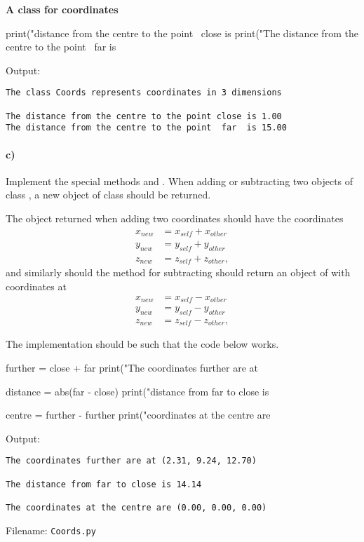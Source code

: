 \begin{Problem} {\textbf{A class for coordinates}}
\begin{python}
print("\nThe distance from the centre to the point \
close is %
print("The distance from the centre to the point  \
far  is %
\end{python}
Output:
\begin{lstlisting}
The class Coords represents coordinates in 3 dimensions

The distance from the centre to the point close is 1.00
The distance from the centre to the point  far  is 15.00
\end{lstlisting}


\paragraph{c)} Implement the special methods  and \newline  {}. When adding or subtracting two objects of class , a new object of class  should be returned. 

The object returned when adding two coordinates should have the coordinates
\begin{equation*}
\begin{split}
    x_{new} &= x_{self} + x_{other} \\
    y_{new} &= y_{self} + y_{other} \\
    z_{new} &= z_{self} + z_{other} ,
\end{split}
\end{equation*}
and similarly should the method for subtracting should return an object of  with coordinates at
\begin{equation*}
\begin{split}
    x_{new} &= x_{self} - x_{other} \\
    y_{new} &= y_{self} - y_{other} \\
    z_{new} &= z_{self} - z_{other} ,
\end{split}
\end{equation*}

The implementation should be such that the code below works.
\begin{python}
further = close + far
print("The coordinates further are at %

distance = abs(far - close)
print("\nThe distance from far to close is %

centre = further - further
print("\nThe coordinates at the centre are %
\end{python}
Output:
\begin{lstlisting}
The coordinates further are at (2.31, 9.24, 12.70)

The distance from far to close is 14.14

The coordinates at the centre are (0.00, 0.00, 0.00)
\end{lstlisting}


Filename: \texttt{Coords.py}
\end{Problem}
